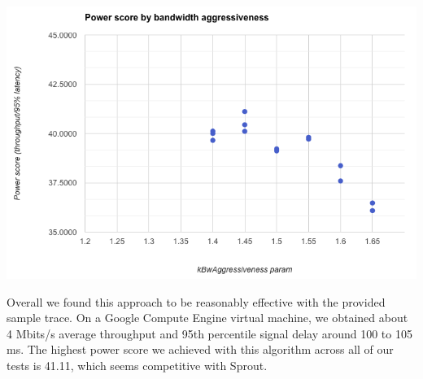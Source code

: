 \documentclass{article}
\begin{document}
\begin{center}
\includegraphics[width=1.0\textwidth]{images/exercise_d_bw_aggressiveness.png}
\end{center}

Overall we found this approach to be reasonably effective with the provided sample trace. On a Google Compute Engine virtual machine, we obtained about 4 Mbits/s average throughput and 95th percentile signal delay around 100 to 105 ms. The highest power score we achieved with this algorithm across all of our tests is 41.11, which seems competitive with Sprout.
\end{document}
